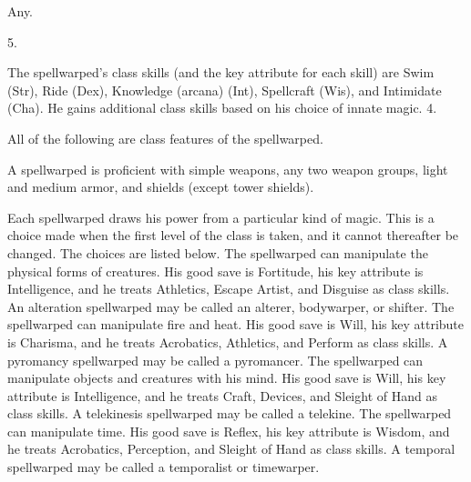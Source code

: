  Any.

 5.

The spellwarped's class skills (and the key attribute for each skill) are Swim (Str), Ride (Dex), Knowledge (arcana) (Int), Spellcraft (Wis), and Intimidate (Cha). He gains additional class skills based on his choice of innate magic.
 4.

All of the following are class features of the spellwarped.

A spellwarped is proficient with simple weapons, any two weapon groups, light and medium armor, and shields (except tower shields).

 Each spellwarped draws his power from a particular kind of magic. This is a choice made when the first level of the class is taken, and it cannot thereafter be changed. The choices are listed below.
 The spellwarped can manipulate the physical forms of creatures. His good save is Fortitude, his key attribute is Intelligence, and he treats Athletics, Escape Artist, and Disguise as class skills. An alteration spellwarped may be called an alterer, bodywarper, or shifter.
 The spellwarped can manipulate fire and heat. His good save is Will, his key attribute is Charisma, and he treats Acrobatics, Athletics, and Perform as class skills. A pyromancy spellwarped may be called a pyromancer.
 The spellwarped can manipulate objects and creatures with his mind. His good save is Will, his key attribute is Intelligence, and he treats Craft, Devices, and Sleight of Hand as class skills. A telekinesis spellwarped may be called a telekine.
 The spellwarped can manipulate time. His good save is Reflex, his key attribute is Wisdom, and he treats Acrobatics, Perception, and Sleight of Hand as class skills. A temporal spellwarped may be called a temporalist or timewarper.


